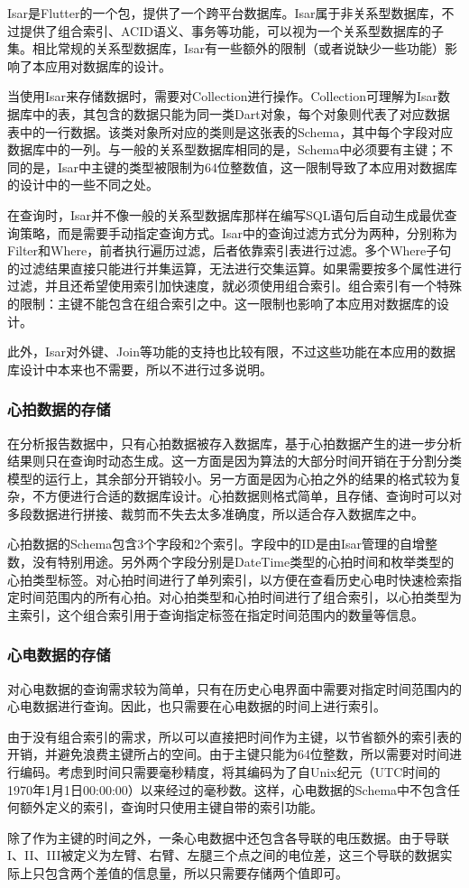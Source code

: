 Isar是Flutter的一个包，提供了一个跨平台数据库。Isar属于非关系型数据库，不过提供了组合索引、ACID语义、事务等功能，可以视为一个关系型数据库的子集。相比常规的关系型数据库，Isar有一些额外的限制（或者说缺少一些功能）影响了本应用对数据库的设计。

当使用Isar来存储数据时，需要对Collection进行操作。Collection可理解为Isar数据库中的表，其包含的数据只能为同一类Dart对象，每个对象则代表了对应数据表中的一行数据。该类对象所对应的类则是这张表的Schema，其中每个字段对应数据库中的一列。与一般的关系型数据库相同的是，Schema中必须要有主键；不同的是，Isar中主键的类型被限制为64位整数值，这一限制导致了本应用对数据库的设计中的一些不同之处。

在查询时，Isar并不像一般的关系型数据库那样在编写SQL语句后自动生成最优查询策略，而是需要手动指定查询方式。Isar中的查询过滤方式分为两种，分别称为Filter和Where，前者执行遍历过滤，后者依靠索引表进行过滤。多个Where子句的过滤结果直接只能进行并集运算，无法进行交集运算。如果需要按多个属性进行过滤，并且还希望使用索引加快速度，就必须使用组合索引。组合索引有一个特殊的限制：主键不能包含在组合索引之中。这一限制也影响了本应用对数据库的设计。

此外，Isar对外键、Join等功能的支持也比较有限，不过这些功能在本应用的数据库设计中本来也不需要，所以不进行过多说明。

\subsubsection{心拍数据的存储}\label{subsubsec:beat-storage}

在分析报告数据中，只有心拍数据被存入数据库，基于心拍数据产生的进一步分析结果则只在查询时动态生成。这一方面是因为算法的大部分时间开销在于分割分类模型的运行上，其余部分开销较小。另一方面是因为心拍之外的结果的格式较为复杂，不方便进行合适的数据库设计。心拍数据则格式简单，且存储、查询时可以对多段数据进行拼接、裁剪而不失去太多准确度，所以适合存入数据库之中。

心拍数据的Schema包含3个字段和2个索引。字段中的ID是由Isar管理的自增整数，没有特别用途。另外两个字段分别是DateTime类型的心拍时间和枚举类型的心拍类型标签。对心拍时间进行了单列索引，以方便在查看历史心电时快速检索指定时间范围内的所有心拍。对心拍类型和心拍时间进行了组合索引，以心拍类型为主索引，这个组合索引用于查询指定标签在指定时间范围内的数量等信息。

\subsubsection{心电数据的存储}\label{subsubsec:point-storage}

对心电数据的查询需求较为简单，只有在历史心电界面中需要对指定时间范围内的心电数据进行查询。因此，也只需要在心电数据的时间上进行索引。

由于没有组合索引的需求，所以可以直接把时间作为主键，以节省额外的索引表的开销，并避免浪费主键所占的空间。由于主键只能为64位整数，所以需要对时间进行编码。考虑到时间只需要毫秒精度，将其编码为了自Unix纪元（UTC时间的1970年1月1日00:00:00）以来经过的毫秒数。这样，心电数据的Schema中不包含任何额外定义的索引，查询时只使用主键自带的索引功能。

除了作为主键的时间之外，一条心电数据中还包含各导联的电压数据。由于导联I、II、III被定义为左臂、右臂、左腿三个点之间的电位差，这三个导联的数据实际上只包含两个差值的信息量，所以只需要存储两个值即可。
